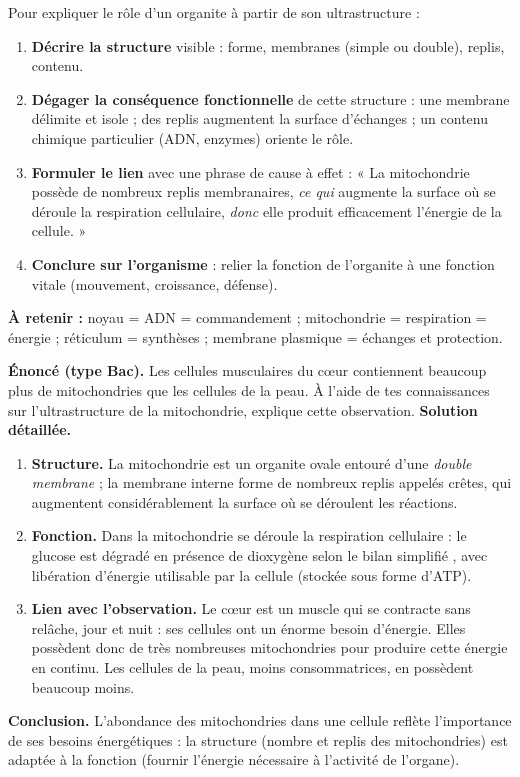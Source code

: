 \documentclass[11pt]{article}
\newcommand{\cle}[1]{{\popxbold\color{popdark}#1}}
\begin{document}
\begin{methode}
Pour expliquer le rôle d'un organite à partir de son ultrastructure :
\begin{enumerate}
\item \textbf{Décrire la structure} visible : forme, membranes (simple ou double), replis, contenu.
\item \textbf{Dégager la conséquence fonctionnelle} de cette structure : une membrane délimite et isole ; des replis augmentent la surface d'échanges ; un contenu chimique particulier (ADN, enzymes) oriente le rôle.
\item \textbf{Formuler le lien} avec une phrase de cause à effet : « La mitochondrie possède de nombreux replis membranaires, \emph{ce qui} augmente la surface où se déroule la respiration cellulaire, \emph{donc} elle produit efficacement l'énergie de la cellule. »
\item \textbf{Conclure sur l'organisme} : relier la fonction de l'organite à une fonction vitale (mouvement, croissance, défense).
\end{enumerate}
\textbf{À retenir :} noyau = ADN = commandement ; mitochondrie = respiration = énergie ; réticulum = synthèses ; membrane plasmique = échanges et protection.
\end{methode}

\begin{exoresolu}
\textbf{Énoncé (type Bac).} Les cellules musculaires du cœur contiennent beaucoup plus de mitochondries que les cellules de la peau. À l'aide de tes connaissances sur l'ultrastructure de la mitochondrie, explique cette observation.
\tcblower
\textbf{Solution détaillée.}
\begin{enumerate}
\item \textbf{Structure.} La mitochondrie est un organite ovale entouré d'une \emph{double membrane} ; la membrane interne forme de nombreux replis appelés crêtes, qui augmentent considérablement la surface où se déroulent les réactions.
\item \textbf{Fonction.} Dans la mitochondrie se déroule la \cle{respiration cellulaire} : le glucose est dégradé en présence de dioxygène selon le bilan simplifié , avec libération d'énergie utilisable par la cellule (stockée sous forme d'ATP).
\item \textbf{Lien avec l'observation.} Le cœur est un muscle qui se contracte sans relâche, jour et nuit : ses cellules ont un énorme besoin d'énergie. Elles possèdent donc de très nombreuses mitochondries pour produire cette énergie en continu. Les cellules de la peau, moins consommatrices, en possèdent beaucoup moins.
\end{enumerate}
\textbf{Conclusion.} L'abondance des mitochondries dans une cellule reflète l'importance de ses besoins énergétiques : la structure (nombre et replis des mitochondries) est adaptée à la fonction (fournir l'énergie nécessaire à l'activité de l'organe).
\end{exoresolu}
\end{document}
